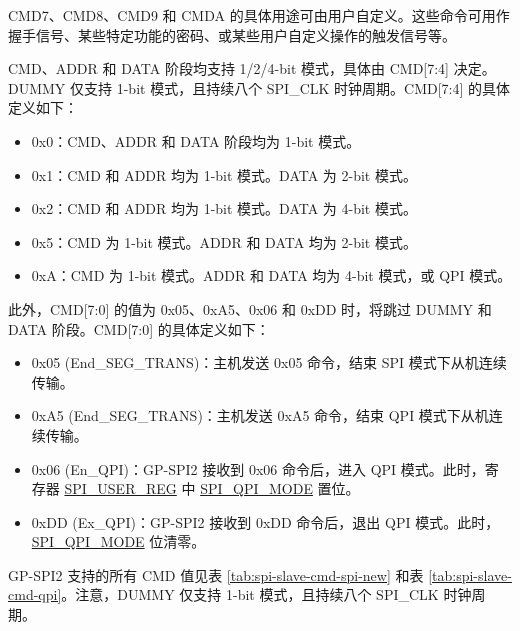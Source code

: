\documentclass[main\_\_CN.tex]{subfiles}
\begin{document}
CMD7、CMD8、CMD9 和 CMDA 的具体用途可由用户自定义。这些命令可用作握手信号、某些特定功能的密码、或某些用户自定义操作的触发信号等。

CMD、ADDR 和 DATA 阶段均支持 1/2/4-bit 模式，具体由 CMD[7:4] 决定。DUMMY 仅支持 1-bit 模式，且持续八个 SPI\_CLK 时钟周期。CMD[7:4] 的具体定义如下：

\begin{itemize}
    \item 0x0：CMD、ADDR 和 DATA 阶段均为 1-bit 模式。
    \item 0x1：CMD 和 ADDR 均为 1-bit 模式。DATA 为 2-bit 模式。
    \item 0x2：CMD 和 ADDR 均为 1-bit 模式。DATA 为 4-bit 模式。
    \item 0x5：CMD 为 1-bit 模式。ADDR 和 DATA 均为 2-bit 模式。
    \item 0xA：CMD 为 1-bit 模式。ADDR 和 DATA 均为 4-bit 模式，或 QPI 模式。
\end{itemize}

此外，CMD[7:0] 的值为 0x05、0xA5、0x06 和 0xDD 时，将跳过 DUMMY 和 DATA 阶段。CMD[7:0] 的具体定义如下：

\begin{itemize}
    \item \label{cmd:ENDSEGTRANS}0x05 (End\_SEG\_TRANS)：主机发送 0x05 命令，结束 SPI 模式下从机连续传输。
    \item 0xA5 (End\_SEG\_TRANS)：主机发送 0xA5 命令，结束 QPI 模式下从机连续传输。
    \item 0x06 (En\_QPI)：GP-SPI2 接收到 0x06 命令后，进入 QPI 模式。此时，寄存器 \hyperref[regdesc:SPIUSERREG]{SPI\_USER\_REG} 中 \hyperref[fielddesc:SPIQPIMODE]{SPI\_QPI\_MODE} 置位。
    \item 0xDD (Ex\_QPI)：GP-SPI2 接收到 0xDD 命令后，退出 QPI 模式。此时， \hyperref[fielddesc:SPIQPIMODE]{SPI\_QPI\_MODE} 位清零。
\end{itemize}


GP-SPI2 支持的所有 CMD 值见表 \ref{tab:spi-slave-cmd-spi-new} 和表 \ref{tab:spi-slave-cmd-qpi}。注意，DUMMY 仅支持 1-bit 模式，且持续八个 SPI\_CLK 时钟周期。
\end{document}
